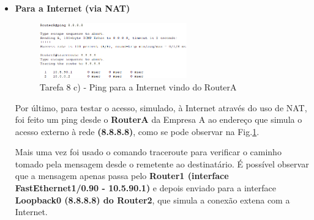 \documentclass[11pt,english, openright, oneside]{book}
\begin{document}
\begin{itemize}
    \pagebreak
    A rota da mensagem é a seguinte:
    \begin{enumerate}
        \item primeiramente passa pela interface \textbf{FastEthernet1/0.95 (10.5.95.5)} do \textbf{Router3}, que faz a ligação com a VLAN 95 da Empresa B (de onde vem a mensagem)
        \item depois é recebida pela interface \textbf{FastEthernet0/0 (10.0.0.1) do Router1}, que faz a ligação entre os routers 1 e 3 do ISP.
        \item a mensagem é agora passada da interface FastEthernet1/0 do Router1 para a interface \textbf{FastEthernet0/0 do RouterA} da Empresa A.
        \item finalmente é entregue pelo RouterA ao destinatário \textbf{PC5 (172.24.53.1)}. 
    \end{enumerate} \par \vspace{0.4cm}

    Toda a configuração dos dispositivos e interfaces é claro crucial ao funcionamento do envio de mensagens, para além dos protocolos de roteamento. \par

    \vspace{1.2cm}
    \item \textbf{Para a Internet (via NAT)}
    \begin{figure}[H]
        \centering
        \includegraphics[width=0.6\textwidth]{imagens/Tarefa8/8.c_internet.png}
        \caption{Tarefa 8 c) - Ping para a Internet vindo do RouterA}
        \label{fig:8.c_internet}
    \end{figure}

    Por último, para testar o acesso, simulado, à Internet através do uso de NAT, foi feito um ping desde o \textbf{RouterA} da Empresa A ao endereço que simula o acesso externo à rede \textbf{(8.8.8.8)}, como se pode observar na Fig.\ref{fig:8.c_internet}. \par
    Mais uma vez foi usado o comando traceroute para verificar o caminho tomado pela mensagem desde o remetente ao destinatário. É possível observar que a mensagem apenas passa pelo \textbf{Router1 (interface FastEthernet1/0.90 - 10.5.90.1)} e depois enviado para a interface \textbf{Loopback0 (8.8.8.8) do Router2}, que simula a conexão extena com a Internet. \par
\end{itemize} \par \vspace{0.8cm}
\end{document}
